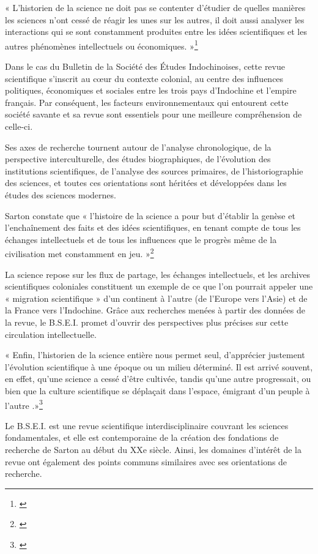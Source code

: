 « L’historien de la science ne doit pas se contenter d’étudier de quelles manières les sciences n’ont cessé de réagir les unes sur les autres, il doit aussi analyser les interactions qui se sont constamment produites entre les idées scientifiques et les autres phénomènes intellectuels ou économiques. »\footnote{\cite{sarton}} 

Dans le cas du Bulletin de la Société des Études Indochinoises, cette revue scientifique s'inscrit au cœur du contexte colonial, au centre des influences politiques, économiques et sociales entre les trois pays d'Indochine et l'empire français. Par conséquent, les facteurs environnementaux qui entourent cette société savante et sa revue sont essentiels pour une meilleure compréhension de celle-ci.

Ses axes de recherche tournent autour de l'analyse chronologique, de la perspective interculturelle, des études biographiques, de l'évolution des institutions scientifiques, de l'analyse des sources primaires, de l'historiographie des sciences, et toutes ces orientations sont héritées et développées dans les études des sciences modernes.

Sarton constate que « l’histoire de la science a pour but d’établir la genèse et l'enchaînement des faits et des idées scientifiques, en tenant compte de tous les échanges intellectuels et de tous les influences que le progrès même de la civilisation met constamment en jeu. »\footnote{\cite{sarton}}

La science repose sur les flux de partage, les échanges intellectuels, et les archives scientifiques coloniales constituent un exemple de ce que l'on pourrait appeler une « migration scientifique » d'un continent à l'autre (de l'Europe vers l'Asie) et de la France vers l'Indochine. Grâce aux recherches menées à partir des données de la revue, le B.S.E.I. promet d'ouvrir des perspectives plus précises sur cette circulation intellectuelle.

« Enfin, l’historien de la science entière nous permet seul, d’apprécier justement l’évolution scientifique à une époque ou un milieu déterminé. Il est arrivé souvent, en effet, qu’une science a cessé d’être cultivée, tandis qu’une autre progressait, ou bien que la culture scientifique se déplaçait dans l’espace, émigrant d’un peuple à l’autre .»\footnote{\cite{sarton}}

Le B.S.E.I. est une revue scientifique interdisciplinaire couvrant les sciences fondamentales, et elle est contemporaine de la création des fondations de recherche de Sarton au début du XXe siècle. Ainsi, les domaines d'intérêt de la revue ont également des points communs similaires avec ses orientations de recherche.

